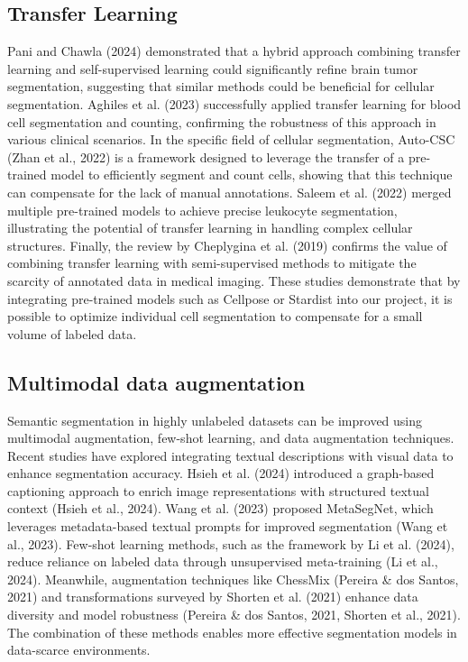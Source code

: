 \documentclass[]{article}
\begin{document}
\subsection{Transfer Learning}
Pani and Chawla (2024) demonstrated that a hybrid approach combining transfer learning and self-supervised learning could significantly refine brain tumor segmentation, suggesting that similar methods could be beneficial for cellular segmentation. Aghiles et al. (2023) successfully applied transfer learning for blood cell segmentation and counting, confirming the robustness of this approach in various clinical scenarios. In the specific field of cellular segmentation, Auto-CSC (Zhan et al., 2022) is a framework designed to leverage the transfer of a pre-trained model to efficiently segment and count cells, showing that this technique can compensate for the lack of manual annotations. Saleem et al. (2022) merged multiple pre-trained models to achieve precise leukocyte segmentation, illustrating the potential of transfer learning in handling complex cellular structures. Finally, the review by Cheplygina et al. (2019) confirms the value of combining transfer learning with semi-supervised methods to mitigate the scarcity of annotated data in medical imaging. These studies demonstrate that by integrating pre-trained models such as Cellpose or Stardist into our project, it is possible to optimize individual cell segmentation to compensate for a small volume of labeled data.
\subsection{Multimodal data augmentation}
Semantic segmentation in highly unlabeled datasets can be improved using multimodal augmentation, few-shot learning, and data augmentation techniques. Recent studies have explored integrating textual descriptions with visual data to enhance segmentation accuracy. Hsieh et al. (2024) introduced a graph-based captioning approach to enrich image representations with structured textual context (Hsieh et al., 2024). Wang et al. (2023) proposed MetaSegNet, which leverages metadata-based textual prompts for improved segmentation (Wang et al., 2023). Few-shot learning methods, such as the framework by Li et al. (2024), reduce reliance on labeled data through unsupervised meta-training (Li et al., 2024). Meanwhile, augmentation techniques like ChessMix (Pereira \& dos Santos, 2021) and transformations surveyed by Shorten et al. (2021) enhance data diversity and model robustness (Pereira \& dos Santos, 2021, Shorten et al., 2021). The combination of these methods enables more effective segmentation models in data-scarce environments.
\end{document}
